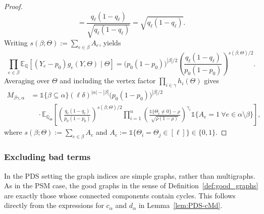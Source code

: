 \documentclass[11pt, letterpaper]{article}
\numberwithin{equation}{section}
\newcommand{\E}{\mathbb{E}}
\newcommand{\QQ}{\mathbb{Q}}
\begin{document}
\begin{proof}
\[= \frac{q_\ell(1-q_\ell)}{\sqrt{q_\ell(1-q_\ell)}}
= \sqrt{q_\ell(1-q_\ell)}.
\]
Writing $s(\beta;\Theta):=\sum_{e\in\beta}A_e$, yields
\[
\prod_{e\in\beta}\E_{\QQ}[(Y_e-p_0)g_e(Y,\Theta)\mid\Theta]
=
\big(p_0(1-p_0)\big)^{|\beta|/2}
\left(\frac{q_\ell(1-q_\ell)}{p_0(1-p_0)}\right)^{s(\beta;\Theta)/2}.
\]
Averaging over $\Theta$ and including the vertex factor $\prod_{i\in\gamma}h_i(\Theta)$ gives
\begin{align*}
M_{\beta\gamma,\alpha}
&=
\mathds 1\{\beta\subseteq\alpha\} 
(\ell\delta)^{|\alpha|-|\beta|} 
\big(p_0(1-p_0)\big)^{|\beta|/2} \\
&\quad\cdot
\E_{\QQ_\Theta} \left[
\left(\frac{q_\ell(1-q_\ell)}{p_0(1-p_0)}\right)^{s(\beta;\Theta)/2}
\prod_{i=1}^n
\left(\frac{\mathds 1\{\Theta_i\neq 0\}-\rho}{\sqrt{\rho(1-\rho)}}\right)^{\gamma_i}
\mathds 1\{A_e=1\ \forall e\in\alpha\setminus\beta\}\right],
\end{align*}
%
where $s(\beta;\Theta):=\sum_{e\in\beta} A_e$ and $A_e:=\mathds 1\{\Theta_i=\Theta_j\in[\ell]\}\in\{0,1\}$.
\end{proof}

\subsubsection*{Excluding bad terms}
In the PDS setting the graph indices are simple graphs, rather than multigraphs. As in the PSM case, the good graphs in the sense of Definition~\ref{def:good_graphs} are exactly those whose connected components contain cycles. This follows directly from the expressions for $c_\alpha$ and $d_\alpha$ in Lemma~\ref{lem:PDS-cMd}.
\end{document}
